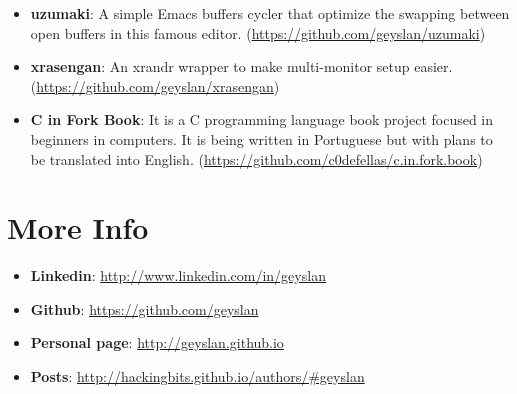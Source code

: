 \documentclass[margin]{res}
\begin{document}
\begin{resume}
\begin{itemize}
\item \textbf{uzumaki}: A simple Emacs buffers cycler that optimize the
  swapping between open buffers in this famous editor.\newline
  (\url{https://github.com/geyslan/uzumaki})\vspace{1mm}

\item \textbf{xrasengan}: An xrandr wrapper to make multi-monitor setup
  easier.\newline (\url{https://github.com/geyslan/xrasengan})\vspace{1mm}

\item \textbf{C in Fork Book}: It is a C programming language book project
  focused in beginners in computers. It is being written in Portuguese but with
  plans to be translated into English.\newline
  (\url{https://github.com/c0defellas/c.in.fork.book})
\end{itemize}

\section{More Info}
\begin{itemize}
\item \textbf{Linkedin}: \url{http://www.linkedin.com/in/geyslan}
\item \textbf{Github}: \url{https://github.com/geyslan}
\item \textbf{Personal page}: \url{http://geyslan.github.io}
\item \textbf{Posts}: \url{http://hackingbits.github.io/authors/#geyslan}
\end{itemize}

\end{resume}
\end{document}
